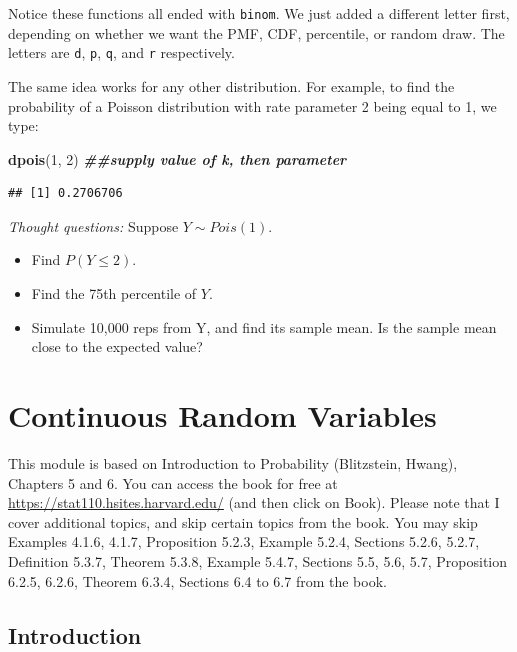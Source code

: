 \documentclass[
]{book}
\newenvironment{Shaded}{\begin{snugshade}}{\end{snugshade}}
\newcommand{\DecValTok}[1]{\textcolor[rgb]{0.00,0.00,0.81}{#1}}
\newcommand{\DocumentationTok}[1]{\textcolor[rgb]{0.56,0.35,0.01}{\textbf{\textit{#1}}}}
\newcommand{\FunctionTok}[1]{\textcolor[rgb]{0.13,0.29,0.53}{\textbf{#1}}}
\newcommand{\NormalTok}[1]{#1}
\providecommand{\tightlist}{%
  \setlength{\itemsep}{0pt}\setlength{\parskip}{0pt}}
\begin{document}
Notice these functions all ended with \texttt{binom}. We just added a different letter first, depending on whether we want the PMF, CDF, percentile, or random draw. The letters are \texttt{d}, \texttt{p}, \texttt{q}, and \texttt{r} respectively.

The same idea works for any other distribution. For example, to find the probability of a Poisson distribution with rate parameter 2 being equal to 1, we type:

\begin{Shaded}
\begin{Highlighting}[]
\FunctionTok{dpois}\NormalTok{(}\DecValTok{1}\NormalTok{, }\DecValTok{2}\NormalTok{) }\DocumentationTok{\#\#supply value of k, then parameter}
\end{Highlighting}
\end{Shaded}

\begin{verbatim}
## [1] 0.2706706
\end{verbatim}

\emph{Thought questions:} Suppose \(Y \sim Pois(1)\).

\begin{itemize}
\tightlist
\item
  Find \(P(Y \leq 2)\).
\item
  Find the 75th percentile of \(Y\).
\item
  Simulate 10,000 reps from Y, and find its sample mean. Is the sample mean close to the expected value?
\end{itemize}

\chapter{Continuous Random Variables}\label{continuous-random-variables}

This module is based on Introduction to Probability (Blitzstein, Hwang), Chapters 5 and 6. You can access the book for free at \url{https://stat110.hsites.harvard.edu/} (and then click on Book). Please note that I cover additional topics, and skip certain topics from the book. You may skip Examples 4.1.6, 4.1.7, Proposition 5.2.3, Example 5.2.4, Sections 5.2.6, 5.2.7, Definition 5.3.7, Theorem 5.3.8, Example 5.4.7, Sections 5.5, 5.6, 5.7, Proposition 6.2.5, 6.2.6, Theorem 6.3.4, Sections 6.4 to 6.7 from the book.

\section{Introduction}\label{introduction}
\end{document}
